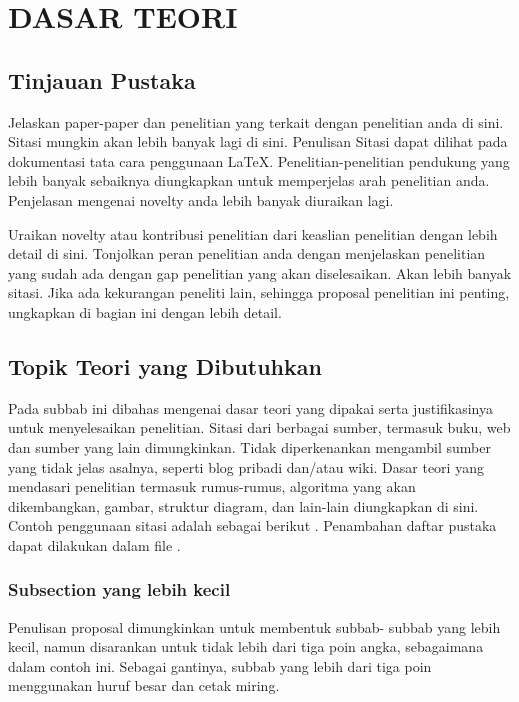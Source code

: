 \chapter{\uppercase{Dasar Teori}}\label{dasarteori}

\section{Tinjauan Pustaka}
Jelaskan paper-paper dan penelitian yang terkait dengan penelitian anda di sini. Sitasi mungkin akan lebih banyak lagi di sini. Penulisan Sitasi dapat dilihat pada dokumentasi tata cara penggunaan \LaTeX. Penelitian-penelitian pendukung yang lebih banyak sebaiknya diungkapkan untuk memperjelas arah penelitian anda.  Penjelasan mengenai novelty anda lebih banyak diuraikan lagi.

Uraikan novelty atau kontribusi penelitian dari keaslian penelitian dengan lebih detail di sini. Tonjolkan peran penelitian anda dengan menjelaskan penelitian yang sudah ada dengan gap penelitian yang akan diselesaikan. Akan lebih banyak sitasi. Jika ada kekurangan peneliti lain, sehingga proposal penelitian ini penting, ungkapkan di bagian ini dengan lebih detail.

\section{Topik Teori yang Dibutuhkan} \label{teori}
Pada subbab ini dibahas mengenai dasar teori yang dipakai serta justifikasinya untuk menyelesaikan penelitian. Sitasi dari berbagai sumber, termasuk buku, web dan sumber yang lain dimungkinkan. Tidak diperkenankan mengambil sumber yang tidak jelas asalnya, seperti blog pribadi dan/atau wiki. Dasar teori yang mendasari penelitian termasuk rumus-rumus, algoritma yang akan dikembangkan, gambar, struktur diagram, dan lain-lain diungkapkan di sini. Contoh penggunaan sitasi adalah sebagai berikut \citep{contohdafpus}. Penambahan daftar pustaka dapat dilakukan dalam file .

\subsection{Subsection yang lebih kecil}
Penulisan proposal dimungkinkan untuk membentuk subbab- subbab yang lebih kecil, namun disarankan untuk tidak lebih dari tiga poin angka, sebagaimana dalam contoh ini. Sebagai gantinya, subbab yang lebih dari tiga poin menggunakan huruf besar dan cetak miring.

